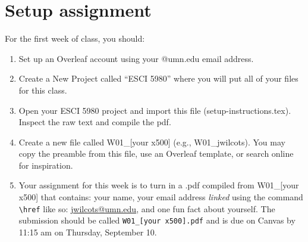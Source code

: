 \documentclass{article} %
\begin{document}
\section{Setup assignment}
For the first week of class, you should:
\begin{enumerate}
    \item Set up an Overleaf account using your @umn.edu email address.
    \item Create a New Project called ``ESCI 5980'' where you will put all of your files for this class. 
    \item Open your ESCI 5980 project and import this file (setup-instructions.tex). Inspect the raw text and compile the pdf. 
    \item Create a new file called W01\_[your x500] (e.g., W01\_jwilcots). You may copy the preamble from this file, use an Overleaf template, or search online for inspiration.
    \item Your assignment for this week is to turn in a .pdf compiled from W01\_[your x500] that contains: your name, your email address \textit{linked} using the command \texttt{\textbackslash href} like so: \href{mailto:jwilcots@umn.edu}{jwilcots@umn.edu}, and one fun fact about yourself. The submission should be called \texttt{W01\_[your x500].pdf} and is due on Canvas by 11:15 am on Thursday, September 10.
\end{enumerate}
\end{document}
